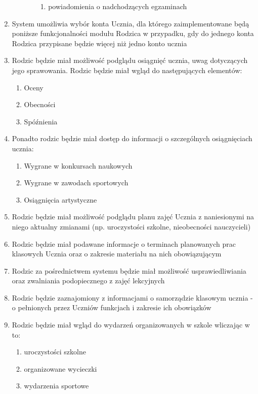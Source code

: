 \documentclass{article}
\begin{document}
\begin{enumerate}
\begin{enumerate}
\begin{enumerate}
\begin{enumerate}
				\item powiadomienia o nadchodzących egzaminach
			\end{enumerate}
		\end{enumerate} 
	\end{enumerate}
	\item System umożliwia wybór konta Ucznia, dla którego zaimplementowane będą poniższe funkcjonalności modułu Rodzica w przypadku, gdy do jednego konta Rodzica przypisane będzie więcej niż jedno konto ucznia
	\item Rodzic będzie miał możliwość podglądu osiągnięć ucznia, uwag dotyczących jego sprawowania. Rodzic będzie miał wgląd do następujących elementów:
	\begin{enumerate}
		\item Oceny
		\item Obecności
		\item Spóźnienia
	\end{enumerate}
	\item Ponadto rodzic będzie miał dostęp do informacji o szczególnych osiągnięciach ucznia:
	\begin{enumerate}
		\item 	Wygrane w konkursach naukowych
		\item Wygrane w zawodach sportowych
		\item Osiągnięcia artystyczne
	\end{enumerate}
	\item Rodzic będzie miał możliwość podglądu planu zajęć Ucznia z naniesionymi na niego aktualny zmianami  (np. uroczystości szkolne, nieobecności nauczycieli)
	\item Rodzic będzie miał podawane informacje o terminach planowanych prac klasowych Ucznia oraz o zakresie materiału na nich obowiązującym
	\item Rodzic za pośrednictwem systemu będzie miał możliwość usprawiedliwiania oraz zwalniania podopiecznego z zajęć lekcyjnych
	\item Rodzic będzie zaznajomiony z informacjami o samorządzie klasowym ucznia - o pełnionych przez Uczniów funkcjach i zakresie ich obowiązków
	\item Rodzic będzie miał wgląd do wydarzeń organizowanych w szkole wliczając w to:
	\begin{enumerate}
		\item uroczystości szkolne
		\item organizowane wycieczki
		\item wydarzenia sportowe
	\end{enumerate}

\end{enumerate}
\end{document}
